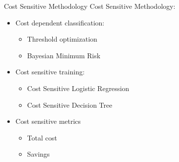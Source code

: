 \documentclass[10pt]{beamer}
\begin{document}
\begin{frame}{Cost Sensitive Methodology}
    Cost Sensitive Methodology:
    \begin{itemize}
        \item Cost dependent classification:
            \begin{itemize}
                \item Threshold optimization
                \item Bayesian Minimum Risk
            \end{itemize}{}
        \item Cost sensitive training:
            \begin{itemize}
                \item Cost Sensitive Logistic Regression
                \item Cost Sensitive Decision Tree
            \end{itemize}
        \item Cost sensitive metrics
            \begin{itemize}
                \item Total cost
                \item Savings
            \end{itemize}{}
    \end{itemize}
\end{frame}{}
\end{document}

